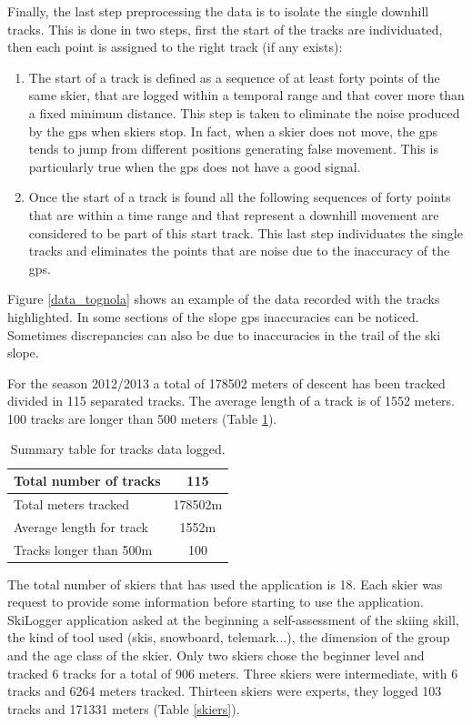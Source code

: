 \documentclass[12pt,a4paper,twoside]{book}
\begin{document}
Finally, the last step preprocessing the data is to isolate the single downhill tracks. This is done in two steps, first the start of the tracks are individuated, then each point is assigned to the right track (if any exists):
\begin{enumerate}
\item The start of a track is defined as a sequence of at least forty points of the same skier, that are logged within a temporal range and that cover more than a fixed minimum distance. This step is taken to eliminate the noise produced by the gps when skiers stop. In fact, when a skier does not move, the gps tends to jump from different positions generating false movement. This is particularly true when the gps does not have a good signal.
\item Once the start of a track is found all the following sequences of forty points that are within a time range and that represent a downhill movement are considered to be part of this start track. This last step individuates the single tracks and eliminates the points that are noise due to the inaccuracy of the gps.
\end{enumerate}

Figure \ref{data_tognola} shows an example of the data recorded with the tracks highlighted. In some sections of the slope gps inaccuracies can be noticed. Sometimes discrepancies can  also be due to inaccuracies in the trail of the ski slope.

For the season 2012/2013 a total of 178502 meters of descent has been tracked divided in 115 separated tracks. The average length of a track is of 1552 meters. 100 tracks are longer than 500 meters (Table \ref{descendts}).

\begin{table}[!h]
  \centering
  \begin{tabular}{ | l | c | }
    \hline
    Total number of tracks & 115 \\ \hline
    Total meters tracked & 178502m \\ \hline
    Average length for track & 1552m \\ \hline
    Tracks longer than 500m & 100 \\
    \hline
  \end{tabular}
  \caption{Summary table for tracks data logged.}
  \label{descendts}
\end{table}

The total number of skiers that has used the application is 18. Each skier was request to provide some information before starting to use the application. SkiLogger application asked at the beginning a self-assessment of the skiing skill, the kind of tool used (skis, snowboard, telemark...), the dimension of the group and the age class of the skier. Only two skiers chose the beginner level and tracked 6 tracks for a total of 906 meters. Three skiers were intermediate, with 6 tracks and 6264 meters tracked. Thirteen skiers were experts, they logged 103 tracks and 171331 meters (Table \ref{skiers}).
\end{document}
